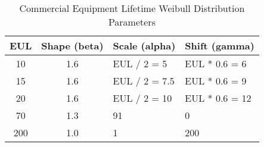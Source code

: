 \begin{table}
\small
\centering
\caption[Commercial Equipment Lifetime Weibull Distribution Parameters]{Commercial Equipment Lifetime Weibull Distribution Parameters}
\label{tab:eul_distributions}
\begin{tabular}{|c|c|l|l|}
\hline
\textbf{EUL} & \textbf{Shape (beta)} & \textbf{Scale (alpha)} & \textbf{Shift (gamma)}    \\ \hline
10  & 1.6          & EUL / 2 = 5     & EUL * 0.6 = 6  \\ \hline
15  & 1.6          & EUL / 2 = 7.5   & EUL * 0.6 = 9  \\ \hline
20  & 1.6          & EUL / 2 = 10    & EUL * 0.6 = 12 \\ \hline
70  & 1.3          & 91              & 0              \\ \hline
200 & 1.0          & 1               & 200            \\ \hline
\end{tabular}
\end{table}